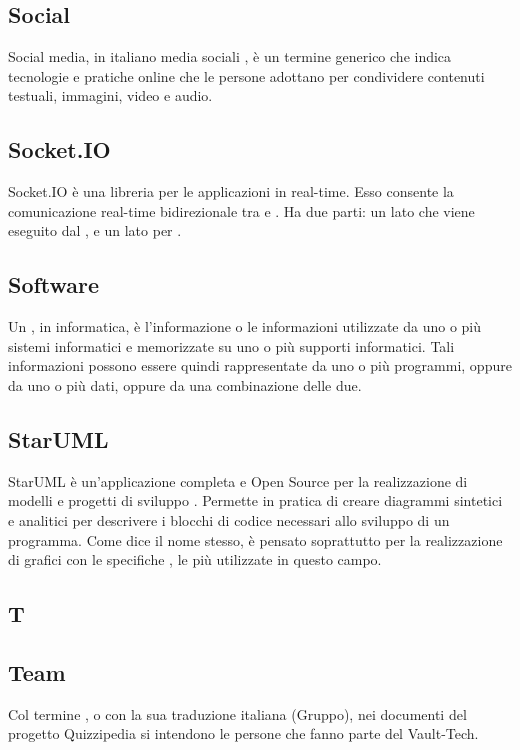 \subsection{Social}
Social media, in italiano media sociali , è un termine generico che indica tecnologie e pratiche online che le persone adottano per condividere contenuti testuali, immagini, video e audio.

\subsection{Socket.IO}
Socket.IO è una libreria  per le applicazioni  in real-time. Esso consente la comunicazione real-time bidirezionale tra  e  . Ha due parti: un lato  che viene eseguito dal  , e un lato  per .

\subsection{Software}
Un , in informatica, è l'informazione o le informazioni utilizzate da uno o più
sistemi informatici e memorizzate su uno o più supporti informatici. Tali informazioni possono
essere quindi rappresentate da uno o più programmi, oppure da uno o più dati, oppure
da una combinazione delle due.

\subsection{StarUML}
StarUML è un'applicazione completa e Open Source per la realizzazione di modelli e progetti di sviluppo . Permette in pratica di creare diagrammi sintetici e analitici per descrivere i blocchi di codice necessari allo sviluppo di un programma. Come dice il nome stesso,  è pensato soprattutto per la realizzazione di grafici con le specifiche , le più utilizzate in questo campo.

\newpage

\begin{center}
\Huge\section{\uppercase{T}}
\end{center}

\subsection{Team}
Col termine , o con la sua traduzione italiana (Gruppo), nei documenti del progetto
Quizzipedia si intendono le persone che fanno parte del Vault-Tech.


